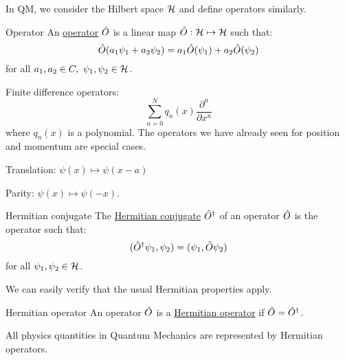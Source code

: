 \documentclass[../Main.tex]{subfiles}
\begin{document}
In QM, we consider the Hilbert space $\mathcal{H}$ and define operators similarly.
\begin{definition}{Operator}
    An \underline{operator} $\hat{O}$ is a linear map $\hat{O} : \mathcal{H} \mapsto \mathcal{H}$ such that:
    \begin{equation*}
        \hat{O}(a_1 \psi_1 + a_2 \psi_2) = a_1 \hat{O}(\psi_1) + a_2 \hat{O}(\psi_2)
    \end{equation*}
    for all $a_1, a_2 \in C,~\psi_1, \psi_2 \in \mathcal{H}$.
\end{definition}
\begin{examples}{}
    \item Finite difference operators:
        \begin{equation*}
            \sum_{n = 0}^N q_n(x) \frac{\partial^{n}}{\partial x^{n}}
        \end{equation*}
        where $q_n(x)$ is a polynomial. The operators we have already seen for position and momentum are special cases.
    \item Translation: $\psi(x) \mapsto \psi(x - a)$
    \item Parity: $\psi(x) \mapsto \psi(-x)$.
\end{examples}
\begin{definition}{Hermitian conjugate}
    The \underline{Hermitian conjugate} $\hat{O}^\dagger$ of an operator $\hat{O}$ is the operator such that:
    \begin{equation*}
        (\hat{O}^\dagger \psi_1, \psi_2) = (\psi_1, \hat{O} \psi_2)
    \end{equation*}
    for all $\psi_1, \psi_2 \in \mathcal{H}$.
\end{definition}
We can easily verify that the usual Hermitian properties apply.
\begin{definition}{Hermitian operator}
    An operator $\hat{O}$ is a \underline{Hermitian operator} if $\hat{O} = \hat{O}^\dagger$.
\end{definition}
\begin{remark}
    All physics quantities in Quantum Mechanics are represented by Hermitian operators.
\end{remark}
\end{document}
